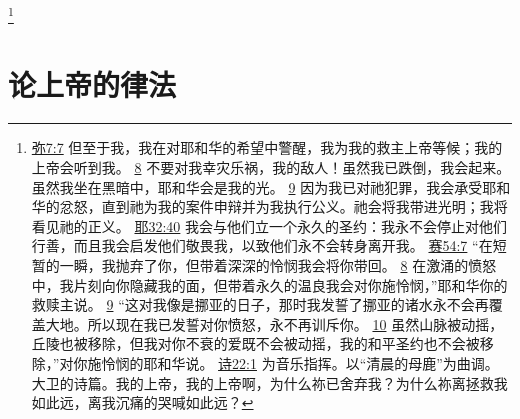 \documentclass[12pt, a4paper, oneside]{ctexart}
\begin{document}
	\footnote {
		\href{https://biblehub.com/micah/7-7.htm}{弥7:7} 但至于我，我在对耶和华的希望中警醒，我为我的救主上帝等候；我的上帝会听到我。
		\href{https://biblehub.com/micah/7-8.htm}{8} 不要对我幸灾乐祸，我的敌人！虽然我已跌倒，我会起来。虽然我坐在黑暗中，耶和华会是我的光。
		\href{https://biblehub.com/micah/7-9.htm}{9} 因为我已对祂犯罪，我会承受耶和华的忿怒，直到祂为我的案件申辩并为我执行公义。祂会将我带进光明；我将看见祂的正义。
		\href{https://biblehub.com/jeremiah/32-40.htm}{耶32:40} 我会与他们立一个永久的圣约：我永不会停止对他们行善，而且我会启发他们敬畏我，以致他们永不会转身离开我。
		\href{https://biblehub.com/isaiah/54-7.htm}{赛54:7} “在短暂的一瞬，我抛弃了你，但带着深深的怜悯我会将你带回。
		\href{https://biblehub.com/isaiah/54-8.htm}{8} 在激涌的愤怒中，我片刻向你隐藏我的面，但带着永久的温良我会对你施怜悯，”耶和华你的救赎主说。
		\href{https://biblehub.com/isaiah/54-9.htm}{9} “这对我像是挪亚的日子，那时我发誓了挪亚的诸水永不会再覆盖大地。所以现在我已发誓对你愤怒，永不再训斥你。
		\href{https://biblehub.com/isaiah/54-10.htm}{10} 虽然山脉被动摇，丘陵也被移除，但我对你不衰的爱既不会被动摇，我的和平圣约也不会被移除，”对你施怜悯的耶和华说。
		\href{https://biblehub.com/psalms/22-1.htm}{诗22:1} 为音乐指挥。以“清晨的母鹿”为曲调。大卫的诗篇。我的上帝，我的上帝啊，为什么祢已舍弃我？为什么祢离拯救我如此远，离我沉痛的哭喊如此远？
	}

\section{论上帝的律法}
\end{document}
